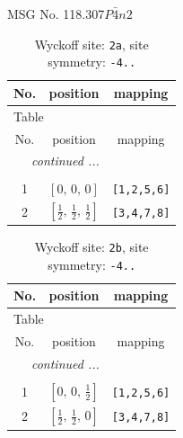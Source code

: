 \documentclass[fleqn,8pt]{jsarticle}
\begin{document}
\setcounter{MaxMatrixCols}{32}

\renewcommand{\tablename}{Table~}
\renewcommand{\figurename}{Figure~}
\begin{center}
\LARGE
MSG No. 118.307\quad$P\bar{4}n2$
\end{center}
\renewcommand{\arraystretch}{1.2}
\begin{longtable}{ccc}
\caption{Wyckoff site: {\tt 2a}, site symmetry: {\tt -4..}}
 \\
 \hline \hline
No. & position & mapping \\ \hline \endfirsthead

\multicolumn{2}{l}{\tablename\ \thetable{}} \\
 \hline \hline
No. & position & mapping \\ \hline \endhead

 \hline \hline
\multicolumn{2}{r}{\footnotesize\it continued ...} \\ \endfoot

 \hline \hline
\multicolumn{2}{r}{} \\ \endlastfoot

1 & $\left[ 0,\, 0,\, 0 \right]$ & {\tt [1,2,5,6]} \\ \hline
2 & $\left[ \frac{1}{2},\, \frac{1}{2},\, \frac{1}{2} \right]$ & {\tt [3,4,7,8]} \\
\end{longtable}
\renewcommand{\arraystretch}{1.2}
\begin{longtable}{ccc}
\caption{Wyckoff site: {\tt 2b}, site symmetry: {\tt -4..}}
 \\
 \hline \hline
No. & position & mapping \\ \hline \endfirsthead

\multicolumn{2}{l}{\tablename\ \thetable{}} \\
 \hline \hline
No. & position & mapping \\ \hline \endhead

 \hline \hline
\multicolumn{2}{r}{\footnotesize\it continued ...} \\ \endfoot

 \hline \hline
\multicolumn{2}{r}{} \\ \endlastfoot

1 & $\left[ 0,\, 0,\, \frac{1}{2} \right]$ & {\tt [1,2,5,6]} \\ \hline
2 & $\left[ \frac{1}{2},\, \frac{1}{2},\, 0 \right]$ & {\tt [3,4,7,8]} \\
\end{longtable}
\end{document}
